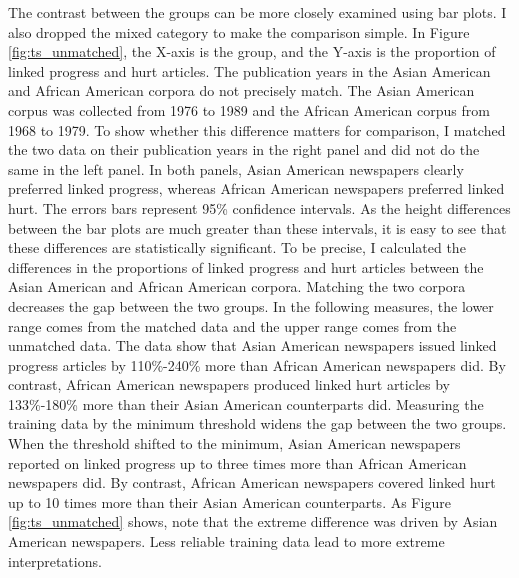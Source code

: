 \documentclass[12 pt]{article}
\begin{document}
The contrast between the groups can be more closely examined using bar plots. I also dropped the mixed category to make the comparison simple. In Figure \ref{fig:ts_unmatched}, the X-axis is the group, and the Y-axis is the proportion of linked progress and hurt articles. The publication years in the Asian American and African American corpora do not precisely match. The Asian American corpus was collected from 1976 to 1989 and the African American corpus from 1968 to 1979. To show whether this difference matters for comparison, I matched the two data on their publication years in the right panel and did not do the same in the left panel. In both panels, Asian American newspapers clearly preferred linked progress, whereas African American newspapers preferred linked hurt. The errors bars represent 95\% confidence intervals. As the height differences between the bar plots are much greater than these intervals, it is easy to see that these differences are statistically significant. To be precise, I calculated the differences in the proportions of linked progress and hurt articles between the Asian American and African American corpora. Matching the two corpora decreases the gap between the two groups. In the following measures, the lower range comes from the matched data and the upper range comes from the unmatched data. The data show that Asian American newspapers issued linked progress articles by 110\%-240\% more than African American newspapers did. By contrast, African American newspapers produced linked hurt articles by 133\%-180\% more than their Asian American counterparts did. Measuring the training data by the minimum threshold widens the gap between the two groups. When the threshold shifted to the minimum, Asian American newspapers reported on linked progress up to three times more than African American newspapers did. By contrast, African American newspapers covered linked hurt up to 10 times more than their Asian American counterparts. As Figure \ref{fig:ts_unmatched} shows, note that the extreme difference was driven by Asian American newspapers. Less reliable training data lead to more extreme interpretations. 
\end{document}
